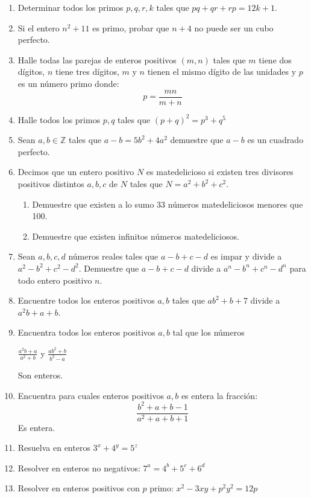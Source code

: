 \documentclass{book}
\newcommand{\Z}{\mathbb{Z}} \def\max{\mathop{\mbox{\rm máx}}} %
\begin{document}
\begin{enumerate}
        \item Determinar todos los primos $p,q,r,k$ tales que $pq+qr+rp= 12k + 1$.
        \item Si el entero $n^2 + 11$ es primo, probar que $n + 4$ no puede ser un cubo perfecto.
        \item Halle todas las parejas de enteros positivos $(m,n)$ tales que $m$ tiene dos dígitos, $n$ tiene tres dígitos, $m$ y                    $n$ tienen el mismo dígito de las unidades y $p$ es un número primo donde:
        $$p=\frac{mn}{m+n}$$
        \item Halle todos los primos $p,q$ tales que ${(p+q)}^2 = p^3+q^5$
        \item Sean $a,b\in \Z$ tales que $a-b=5b^2+4a^2$ demuestre que $a-b$ es un cuadrado perfecto.
        \item Decimos que un entero positivo $N$ es matedelicioso si existen tres divisores positivos distintos $a,b,c$ de $N$ tales que $N = a^2 + b^2 + c^2$.
        \begin{enumerate}
            \item Demuestre que existen a lo sumo 33 números matedeliciosos menores que 100.
            \item Demuestre que existen infinitos números matedeliciosos.
        \end{enumerate}
        \item Sean $a,b,c,d$ números reales tales que $a-b+c-d$ es impar y divide a $a^2-b^2+c^2-d^2$. Demuestre que
        $a-b+c-d$ divide a $a^n-b^n+c^n-d^n$ para todo entero positivo $n$.
        \item Encuentre todos los enteros positivos $a,b$ tales que $ab^2+b+7$ divide a $a^2b+a+b$.
        \item Encuentra todos los enteros positivos $a,b$ tal que los números
        \begin{center}
            $\displaystyle\frac{a^2b+a}{a^2+b}$ y $\displaystyle\frac{ab^2+b}{b^2-a}$
        \end{center}
        Son enteros.
        \item Encuentra para cuales enteros positivos $a,b$ es entera la fracción:
        $$\frac{b^2+a+b-1}{a^2+a+b+1}$$
        Es entera.
        \item Resuelva en enteros $3^x+4^y=5^z$
        \item Resolver en enteros no negativos: $7^a=4^b+5^c+6^d$
        \item Resolver en enteros positivos con $p$ primo: $x^2-3xy+p^2y^2=12p$

\end{enumerate}
\end{document}
